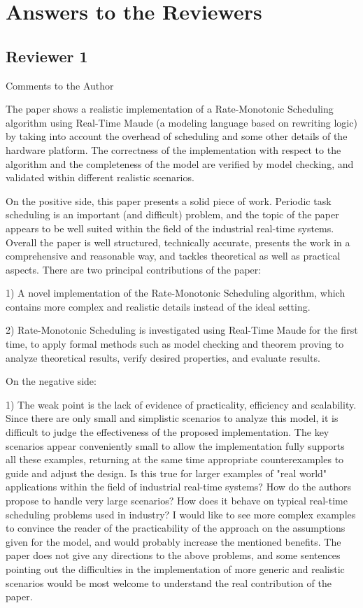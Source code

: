\documentclass[10pt,journal]{IEEEtran}
\begin{document}
\section{Answers to the Reviewers}
\subsection{Reviewer 1}
Comments to the Author

The paper shows a realistic implementation of a Rate-Monotonic
Scheduling algorithm using Real-Time Maude (a modeling language based
on rewriting logic) by taking into account the overhead of scheduling
and some other details of the hardware platform. The correctness of
the implementation with respect to the algorithm and the completeness
of the model are verified by model checking, and validated within
different realistic scenarios.

On the positive side, this paper presents a solid piece of
work. Periodic task scheduling is an important (and difficult)
problem, and the topic of the paper appears to be well suited within
the field of the industrial real-time systems. Overall the paper is
well structured, technically accurate, presents the work in a
comprehensive and reasonable way, and tackles theoretical as well as
practical aspects. There are two principal contributions of the paper:

1) A novel implementation of the Rate-Monotonic Scheduling algorithm,
which contains more complex and realistic details instead of the ideal
setting.

2) Rate-Monotonic Scheduling is investigated using Real-Time Maude for
the first time, to apply formal methods such as model checking and
theorem proving to analyze theoretical results, verify desired
properties, and evaluate results.

On the negative side:

1) The weak point is the lack of evidence of practicality, efficiency
and scalability. Since there are only small and simplistic scenarios
to analyze this model, it is difficult to judge the effectiveness of
the proposed implementation. The key scenarios appear conveniently
small to allow the implementation fully supports all these examples,
returning at the same time appropriate counterexamples to guide and
adjust the design. Is this true for larger examples of "real world"
applications within the field of industrial real-time systems? How do
the authors propose to handle very large scenarios? How does it behave
on typical real-time scheduling problems used in industry? I would
like to see more complex examples to convince the reader of the
practicability of the approach on the assumptions given for the model,
and would probably increase the mentioned benefits. The paper does not
give any directions to the above problems, and some sentences pointing
out the difficulties in the implementation of more generic and
realistic scenarios would be most welcome to understand the real
contribution of the paper.
\end{document}
